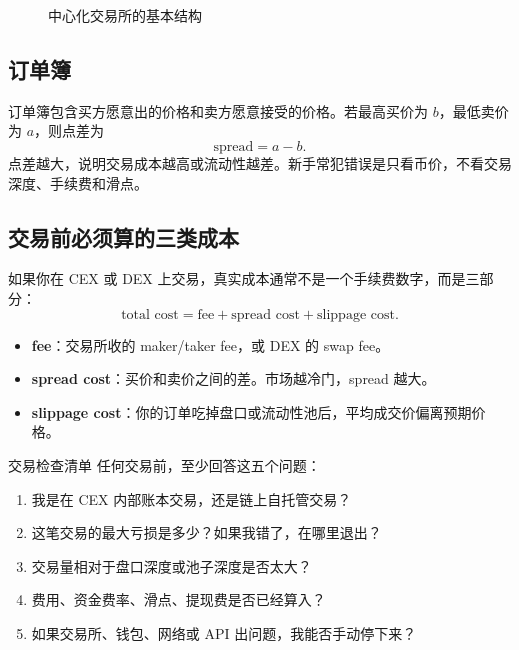 \documentclass[UTF8,11pt]{ctexart}
\newcommand{\term}[1]{\textbf{\sffamily #1}}
\begin{document}
\begin{figure}[h]
\centering
{}
\caption{中心化交易所的基本结构}
\end{figure}

\subsection{订单簿}

订单簿包含买方愿意出的价格和卖方愿意接受的价格。若最高买价为 \(b\)，最低卖价为 \(a\)，则点差为
\[
\text{spread}=a-b.
\]
点差越大，说明交易成本越高或流动性越差。新手常犯错误是只看币价，不看交易深度、手续费和滑点。

\subsection{交易前必须算的三类成本}

如果你在 CEX 或 DEX 上交易，真实成本通常不是一个手续费数字，而是三部分：
\[
\text{total cost} = \text{fee} + \text{spread cost} + \text{slippage cost}.
\]

\begin{itemize}
  \item \term{fee}：交易所收的 maker/taker fee，或 DEX 的 swap fee。
  \item \term{spread cost}：买价和卖价之间的差。市场越冷门，spread 越大。
  \item \term{slippage cost}：你的订单吃掉盘口或流动性池后，平均成交价偏离预期价格。
\end{itemize}

\begin{practicebox}{交易检查清单}
任何交易前，至少回答这五个问题：
\begin{enumerate}
  \item 我是在 CEX 内部账本交易，还是链上自托管交易？
  \item 这笔交易的最大亏损是多少？如果我错了，在哪里退出？
  \item 交易量相对于盘口深度或池子深度是否太大？
  \item 费用、资金费率、滑点、提现费是否已经算入？
  \item 如果交易所、钱包、网络或 API 出问题，我能否手动停下来？
\end{enumerate}
\end{practicebox}
\end{document}
